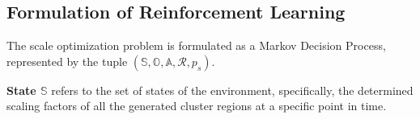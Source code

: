 \documentclass[letterpaper]{article} %
\newcommand\rjf[1]{\textcolor{red}{\{RJF: #1\}}}
\newcommand\yxy[1]{\textcolor{blue}{\{YXY: #1\}}}
\newcommand\qz[1]{\textcolor{blue}{\{QZ: #1\}}}
\begin{document}




\subsection{Formulation of Reinforcement Learning}
\label{sssec:problemFormulation}
The scale optimization problem is formulated as a Markov Decision Process, represented by the tuple $(\mathbb{S}, \mathbb{O}, \mathbb{A}, \mathcal{R}, p_s)$.

\noindent\textbf{State $\mathbb{S}$}
refers to the set of states of the environment, specifically, the determined scaling factors of all the generated cluster regions at a specific point in time. %
\end{document}
